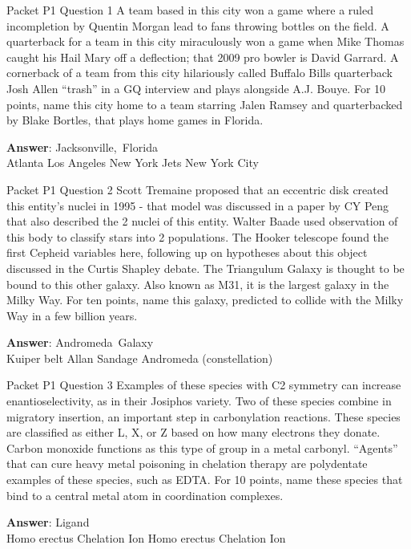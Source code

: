 \begin{frame}{Packet P1 Question 1}
A team based in this city won a game where a ruled incompletion by Quentin Morgan lead to fans throwing bottles on the field. A quarterback for a team in this city miraculously won a game when Mike Thomas caught his Hail Mary off a deflection; that 2009 pro bowler is David Garrard. A cornerback of a team from this city hilariously called Buffalo Bills quarterback Josh Allen “trash” in a GQ interview and plays alongside A.J. Bouye. For 10 points, name this city home to a team starring Jalen Ramsey and quarterbacked by Blake Bortles, that plays home games in Florida.        

\textbf{Answer}: Jacksonville,\ Florida\\
 Atlanta
 Los Angeles
 New York Jets
 New York City
\end{frame}

\begin{frame}{Packet P1 Question 2}
Scott Tremaine proposed   that an eccentric disk created this entity's nuclei in 1995 - that model was discussed in a paper by CY Peng that also described the 2 nuclei of this entity. Walter Baade used observation of this body to classify stars into 2 populations.   The Hooker telescope found the first Cepheid variables here,     following up on hypotheses about this object discussed in the Curtis Shapley debate. The Triangulum Galaxy is thought to be bound to this other galaxy. Also known   as M31, it is the   largest galaxy in the Milky Way. For   ten points, name this galaxy, predicted to collide with the Milky Way in a few billion years.

\textbf{Answer}: Andromeda\ Galaxy\\
 Kuiper belt
 Allan Sandage
 Andromeda (constellation)
\end{frame}

\begin{frame}{Packet P1 Question 3}
Examples of these species with C2 symmetry can increase enantioselectivity,   as in their Josiphos variety. Two of these species combine in migratory insertion, an important step in carbonylation reactions. These species are classified as either L, X, or Z based on how many electrons they donate. Carbon monoxide functions as this type of group in a metal carbonyl. ``Agents'' that can cure heavy metal poisoning in chelation therapy are polydentate examples of these     species, such as EDTA. For 10 points, name these species that bind to a central metal atom in coordination complexes.        

\textbf{Answer}: Ligand\\
 Homo erectus
 Chelation
 Ion
 Homo erectus
 Chelation
 Ion
\end{frame}


